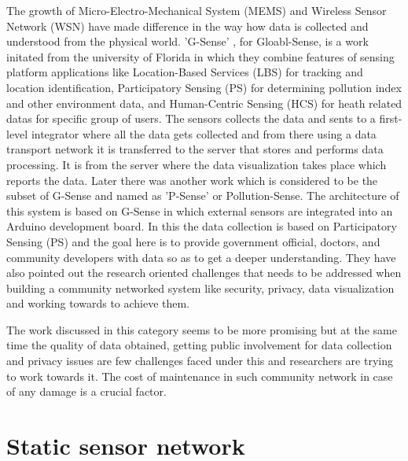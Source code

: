 The growth of Micro-Electro-Mechanical System (MEMS) and Wireless Sensor Network (WSN) have made difference in the way how data is collected and understood from the physical world. 'G-Sense' \cite{Perez2010}, for Gloabl-Sense, is a work initated from the university of Florida in which they combine features of sensing platform applications like Location-Based Services (LBS) for tracking and location identification, Participatory Sensing (PS) for determining pollution index and other environment data, and Human-Centric Sensing (HCS) for heath related datas for specific group of users. The sensors collects the data and sents to a first-level integrator where all the data gets collected and from there using a data transport network it is transferred to the server that stores and performs data processing. It is from the server where the data visualization takes place which reports the data. Later there was another work which is considered to be the subset of G-Sense and named as 'P-Sense' \cite{Mendez2011} or Pollution-Sense. The architecture of this system is based on G-Sense in which external sensors are integrated into an Arduino development board. In this the data collection is based on Participatory Sensing (PS) and the goal here is to provide government official, doctors, and community developers with data so as to get a deeper understanding. They have also pointed out the research oriented challenges that needs to be addressed when building a community networked system like security, privacy, data visualization and working towards to achieve them. 

The work discussed in this category seems to be more promising but at the same time the quality of data obtained, getting public involvement for data collection and privacy issues \cite{Yi2015} are few challenges faced under this and researchers are trying to work towards it. The cost of maintenance in such community network in case of any damage is a crucial factor.



\section{Static sensor network}

